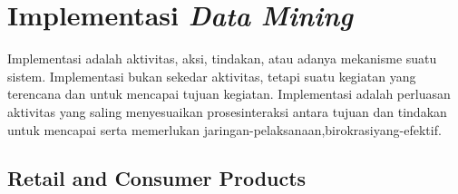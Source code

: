 \section{Implementasi \textit{Data Mining} }

\par Implementasi adalah aktivitas, aksi, tindakan, atau adanya mekanisme suatu sistem. Implementasi bukan sekedar aktivitas, tetapi suatu kegiatan yang terencana dan untuk mencapai tujuan kegiatan. Implementasi adalah perluasan aktivitas yang saling menyesuaikan prosesinteraksi antara tujuan dan tindakan untuk mencapai
serta memerlukan jaringan-pelaksanaan,birokrasiyang-efektif. \cite{tampubolon2013implementasi}

\subsection{Retail and Consumer Products}
